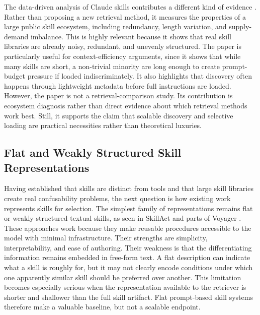 \documentclass[a4paper]{article}
\begin{document}
The data-driven analysis of Claude skills contributes a different kind of evidence \cite{ling2026claudeskills}. Rather than proposing a new retrieval method, it measures the properties of a large public skill ecosystem, including redundancy, length variation, and supply-demand imbalance. This is highly relevant because it shows that real skill libraries are already noisy, redundant, and unevenly structured. The paper is particularly useful for context-efficiency arguments, since it shows that while many skills are short, a non-trivial minority are long enough to create prompt-budget pressure if loaded indiscriminately. It also highlights that discovery often happens through lightweight metadata before full instructions are loaded. However, the paper is not a retrieval-comparison study. Its contribution is ecosystem diagnosis rather than direct evidence about which retrieval methods work best. Still, it supports the claim that scalable discovery and selective loading are practical necessities rather than theoretical luxuries.

\subsection{Flat and Weakly Structured Skill Representations}
Having established that skills are distinct from tools and that large skill libraries create real confusability problems, the next question is how existing work represents skills for selection. The simplest family of representations remains flat or weakly structured textual skills, as seen in SkillAct and parts of Voyager \cite{liu2024skillact, wang2023voyager}. These approaches work because they make reusable procedures accessible to the model with minimal infrastructure. Their strengths are simplicity, interpretability, and ease of authoring. Their weakness is that the differentiating information remains embedded in free-form text. A flat description can indicate what a skill is roughly for, but it may not clearly encode conditions under which one apparently similar skill should be preferred over another. This limitation becomes especially serious when the representation available to the retriever is shorter and shallower than the full skill artifact. Flat prompt-based skill systems therefore make a valuable baseline, but not a scalable endpoint.
\end{document}

